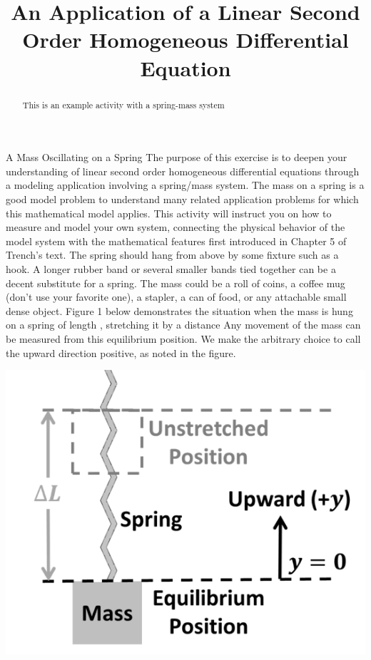 \documentclass{ximera}
\title{An Application of a Linear Second Order Homogeneous Differential Equation
}
\begin{document}
\begin{abstract}
This is an example activity with a spring-mass system
\end{abstract}


\maketitle

A Mass Oscillating on a Spring
The purpose of this exercise is to deepen your understanding of linear second order homogeneous differential equations through a modeling application involving a spring/mass system.  The mass on a spring is a good model problem to understand many related application problems for which this mathematical model applies.  This activity will instruct you on how to measure and model your own system, connecting the physical behavior of the model system with the mathematical features first introduced in Chapter 5 of Trench’s text.
The spring should hang from above by some fixture such as a hook.  A longer rubber band or several smaller bands tied together can be a decent substitute for a spring.  The mass could be a roll of coins, a coffee mug (don’t use your favorite one), a stapler, a can of food, or any attachable small dense object.
Figure 1 below demonstrates the situation when the mass is hung on a spring of length , stretching it by a distance   Any movement of the mass can be measured from this equilibrium position.  We make the arbitrary choice to call the upward direction positive, as noted in the figure.  

\begin{center}
\includegraphics[scale=0.5]{spring-mass.png}
\end{center}
\end{document}
